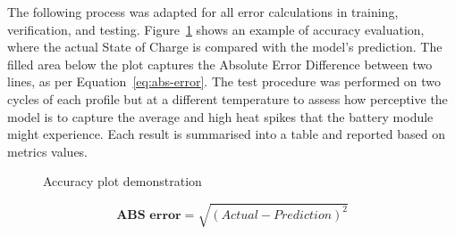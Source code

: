%
The following process was adapted for all error calculations in training, verification, and testing.
Figure~\ref{fig:plot_demo} shows an example of accuracy evaluation, where the actual State of Charge is compared with the model's prediction.
The filled area below the plot captures the Absolute Error Difference between two lines, as per Equation~\ref{eq:abs-error}.
The test procedure was performed on two cycles of each profile but at a different temperature to assess how perceptive the model is to capture the average and high heat spikes that the battery module might experience.
Each result is summarised into a table and reported based on metrics values.
\begin{figure}[ht]
    \centering
    
    \caption{Accuracy plot demonstration}
    \label{fig:plot_demo}
\end{figure}
\begin{equation}
    \textbf{ABS error}  = \sqrt{(Actual-Prediction)^2}
    \label{eq:abs-error}
\end{equation}
%
%
%

